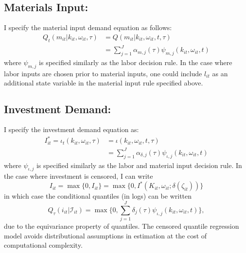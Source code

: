 \documentclass{article}
\begin{document}
\subsection*{Materials Input:}
I specify the material input demand equation as follows:
\begin{equation}\label{mmodel}
\begin{split}
Q_{t}(m_{it}|k_{it}, \omega_{it}, \tau)&=Q(m_{it}|k_{it}, \omega_{it}, t, \tau)\\
&=\sum_{j=1}^{J}\alpha_{m,j}(\tau)\psi_{m,j}(k_{it}, \omega_{it}, t)
\end{split}
\end{equation}
where $\psi_{m,j}$ is specified similarly as the labor decision rule. In the case where labor inputs are chosen prior to material inputs, one could include $l_{it}$ as an additional state variable in the material input rule specified above.

\subsection*{Investment Demand:}
I specify the investment demand equation as:
\begin{equation}\label{imodel}
\begin{split}
I^{*}_{it}=\iota_{t}(k_{it}, \omega_{it}, \tau)&=\iota(k_{it}, \omega_{it}, t, \tau)\\
&=\sum_{j=1}^{J}\alpha_{\delta,j}(\tau)\psi_{\iota,j}(k_{it}, \omega_{it}, t)
\end{split}
\end{equation}
where $\psi_{\iota,j}$ is specified similarly as the labor and material input decision rule. In the case where investment is censored, I can write
\begin{equation}
I_{it}=\max\{0, I_{it}\}=\max\{0, I^{*}(K_{it}, \omega_{it}; \delta(\zeta_{it}))\}
\end{equation}
in which case the conditional quantiles (in logs) can be written
\begin{equation}
Q_{\tau}(i_{it}|\mathcal{I}_{it})=\max\{0, \sum_{j=1}^{J}\delta_{j}(\tau)\psi_{\iota,j}(k_{it}, \omega_{it}, t)\},
\end{equation}
due to the equivariance property of quantiles. The censored quantile regression model avoids distributional assumptions in estimation at the cost of computational complexity.
\end{document}
